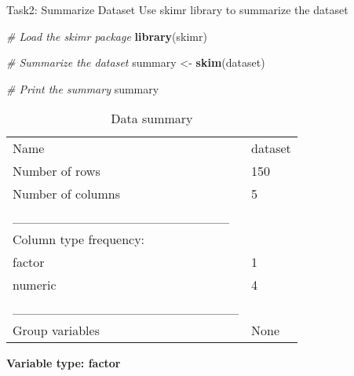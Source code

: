 \documentclass[
]{article}
\newenvironment{Shaded}{\begin{snugshade}}{\end{snugshade}}
\newcommand{\CommentTok}[1]{\textcolor[rgb]{0.56,0.35,0.01}{\textit{#1}}}
\newcommand{\FunctionTok}[1]{\textcolor[rgb]{0.13,0.29,0.53}{\textbf{#1}}}
\newcommand{\NormalTok}[1]{#1}
\newcommand{\OtherTok}[1]{\textcolor[rgb]{0.56,0.35,0.01}{#1}}
\begin{document}
Task2: Summarize Dataset Use skimr library to summarize the dataset

\begin{Shaded}
\begin{Highlighting}[]
\CommentTok{\# Load the skimr package}
\FunctionTok{library}\NormalTok{(skimr)}

\CommentTok{\# Summarize the dataset}
\NormalTok{summary }\OtherTok{\textless{}{-}} \FunctionTok{skim}\NormalTok{(dataset)}

\CommentTok{\# Print the summary}
\NormalTok{summary}
\end{Highlighting}
\end{Shaded}

\begin{longtable}[]{@{}ll@{}}
\caption{Data summary}\tabularnewline
\toprule\noalign{}
\endfirsthead
\endhead
\bottomrule\noalign{}
\endlastfoot
Name & dataset \\
Number of rows & 150 \\
Number of columns & 5 \\
\_\_\_\_\_\_\_\_\_\_\_\_\_\_\_\_\_\_\_\_\_\_\_ & \\
Column type frequency: & \\
factor & 1 \\
numeric & 4 \\
\_\_\_\_\_\_\_\_\_\_\_\_\_\_\_\_\_\_\_\_\_\_\_\_ & \\
Group variables & None \\
\end{longtable}

\textbf{Variable type: factor}
\end{document}
